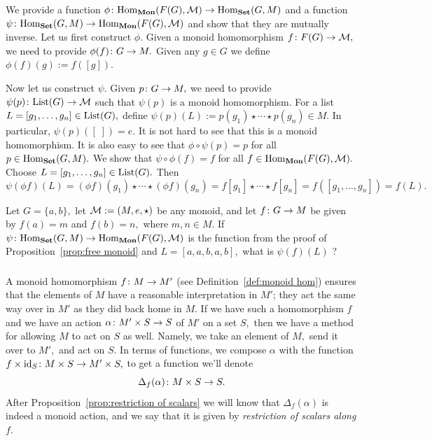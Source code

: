 \documentclass[CT4S-EN-RU]{subfiles}
\begin{document}
\begin{proofENG}
We provide a function $\phi\colon\textnormal{Hom}_{\mathbf{Mon}}(F(G),\mathcal{M})\rightarrow\textnormal{Hom}_{\mathbf{Set}}(G,M)$ and a function $\psi\colon\textnormal{Hom}_{\mathbf{Set}}(G,M)\rightarrow\textnormal{Hom}_{\mathbf{Mon}}(F(G),\mathcal{M})$ and show that they are mutually inverse. Let us first construct $\phi.$ Given a monoid homomorphism $f\colon F(G)\rightarrow\mathcal{M},$ we need to provide $\phi(f)\colon G\rightarrow M.$ Given any $g\in G$ we define $\phi(f)(g):=f([g]).$

Now let us construct $\psi.$ Given $p\colon G\rightarrow M,$ we need to provide $\psi(p)\colon\textnormal{List}(G)\rightarrow\mathcal{M}$ such that $\psi(p)$ is a monoid homomorphism. For a list $L=[g_1,\ldots,g_n]\in\textnormal{List}(G),$ define $\psi(p)(L):=p(g_1)\star\cdots\star p(g_n)\in M.$ In particular, $\psi(p)([\;])=e.$ It is not hard to see that this is a monoid homomorphism. It is also easy to see that $\phi\circ\psi(p)=p$ for all $p\in\textnormal{Hom}_{\mathbf{Set}}(G,M).$ We show that $\psi\circ\phi(f)=f$ for all $f\in\textnormal{Hom}_{\mathbf{Mon}}(F(G),\mathcal{M}).$ Choose $L=[g_1,\ldots,g_n]\in\textnormal{List}(G).$ Then
$$\psi(\phi f)(L)=(\phi f)(g_1)\star\cdots\star(\phi f)(g_n)=f[g_1]\star\cdots\star f[g_n]=f([g_1,\ldots,g_n])=f(L).$$
\end{proofENG}

\begin{proofRUS}
\end{proofRUS}

\begin{exerciseENG}
Let $G=\{a,b\},$ let $\mathcal{M}:=(M,e,\star)$ be any monoid, and let $f\colon G\rightarrow M$ be given by $f(a)=m$ and $f(b)=n,$ where $m,n\in M.$ If $\psi\colon\textnormal{Hom}_{\mathbf{Set}}(G,M)\rightarrow\textnormal{Hom}_{\mathbf{Mon}}(F(G),\mathcal{M})$ is the function from the proof of Proposition~\ref{prop:free monoid} and $L=[a,a,b,a,b],$ what is $\psi(f)(L)$ ?
\end{exerciseENG}

\begin{exerciseRUS}
\end{exerciseRUS}


\subsubsection{}

\begin{blockENG}
A monoid homomorphism $f\colon M\rightarrow M'$ (see Definition~\ref{def:monoid hom}) ensures that the elements of $M$ have a reasonable interpretation in $M'$; they act the same way over in $M'$ as they did back home in $M.$ If we have such a homomorphism $f$ and we have an action $\alpha\colon M'\times S\rightarrow S$ of $M'$ on a set $S,$ then we have a method for allowing $M$ to act on $S$ as well. Namely, we take an element of $M,$ send it over to $M',$ and act on $S.$ In terms of functions, we compose $\alpha$ with the function $f\times\textnormal{id}_S\colon M\times S\rightarrow M'\times S,$ to get a function we'll denote $$\Delta_f(\alpha)\colon M\times S\rightarrow S.$$ After Proposition~\ref{prop:restriction of scalars} we will know that $\Delta_f(\alpha)$ is indeed a monoid action, and we say that it is given by {\em restriction of scalars along $f$}.
\end{blockENG}
\end{document}
